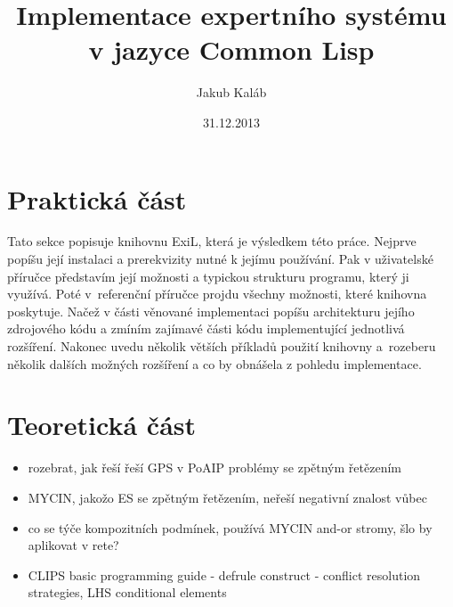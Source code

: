 \documentclass[12pt]{article}
\title{Implementace expertního systému v jazyce Common Lisp}
\author{Jakub Kaláb}
\date{31.12.2013}
\begin{document}
\maketitle
\renewcommand\listoflistingscaption{Seznam příkladů}
\renewcommand\listingscaption{Příklad}
\listoflistings
{}

\nocite{bakalarka}
\nocite{introduction}
\nocite{paradigms}
\nocite{doorenbos}
\nocite{clips}
\nocite{expert-system}
\nocite{rete}

\clearpage


\clearpage
\section{Praktická část}

Tato sekce popisuje knihovnu ExiL\footnotemark, která je výsledkem této práce.
Nejprve popíšu její instalaci a prerekvizity nutné k jejímu používání. Pak v
uživatelské příručce představím její možnosti a typickou strukturu programu,
který ji využívá.  Poté v~referenční příručce projdu všechny možnosti, které
knihovna poskytuje.  Načež v části věnované implementaci popíšu architekturu
jejího zdrojového kódu a zmíním zajímavé části kódu implementující jednotlivá
rozšíření.  Nakonec uvedu několik větších příkladů použití knihovny a~rozeberu
několik dalších možných rozšíření a co by obnášela z pohledu implementace.




\clearpage

% 
\clearpage


\clearpage
\section{Teoretická část}
\begin{framed}
  \begin{itemize}
    \item rozebrat, jak řeší řeší GPS v PoAIP problémy se zpětným řetězením
    \item MYCIN, jakožo ES se zpětným řetězením, neřeší negativní znalost vůbec
    \item co se týče kompozitních podmínek, používá MYCIN and-or stromy, šlo by
      aplikovat v rete?
    \item CLIPS basic programming guide - defrule construct - conflict resolution
      strategies, LHS conditional elements
  \end{itemize}
\end{framed}


\clearpage

% 

\end{document}
